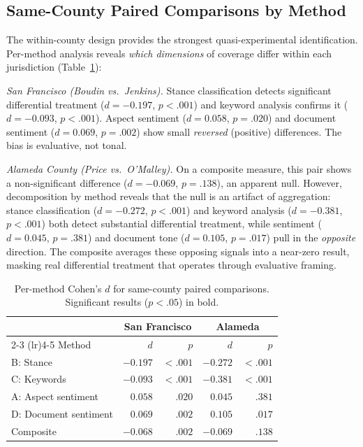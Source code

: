 \documentclass[12pt, letterpaper]{article}
\begin{document}
\subsection{Same-County Paired Comparisons by Method}
\label{sec:paired}

The within-county design provides the strongest quasi-experimental identification. Per-method analysis reveals \emph{which dimensions} of coverage differ within each jurisdiction (Table~\ref{tab:pairedmethod}):

\emph{San Francisco (Boudin vs.\ Jenkins).} Stance classification detects significant differential treatment ($d = -0.197$, $p < .001$) and keyword analysis confirms it ($d = -0.093$, $p < .001$). Aspect sentiment ($d = 0.058$, $p = .020$) and document sentiment ($d = 0.069$, $p = .002$) show small \emph{reversed} (positive) differences. The bias is evaluative, not tonal.

\emph{Alameda County (Price vs.\ O'Malley).} On a composite measure, this pair shows a non-significant difference ($d = -0.069$, $p = .138$), an apparent null. However, decomposition by method reveals that the null is an artifact of aggregation: stance classification ($d = -0.272$, $p < .001$) and keyword analysis ($d = -0.381$, $p < .001$) both detect substantial differential treatment, while sentiment ($d = 0.045$, $p = .381$) and document tone ($d = 0.105$, $p = .017$) pull in the \emph{opposite} direction. The composite averages these opposing signals into a near-zero result, masking real differential treatment that operates through evaluative framing.

\begin{table}[ht]
\centering
\caption{Per-method Cohen's $d$ for same-county paired comparisons. Significant results ($p < .05$) in bold.}
\label{tab:pairedmethod}
\begin{tabular}{lrrrr}
\toprule
& \multicolumn{2}{c}{San Francisco} & \multicolumn{2}{c}{Alameda} \\
\cmidrule(lr){2-3} \cmidrule(lr){4-5}
Method & $d$ & $p$ & $d$ & $p$ \\
\midrule
B: Stance           & $\mathbf{-0.197}$ & $< .001$ & $\mathbf{-0.272}$ & $< .001$ \\
C: Keywords          & $\mathbf{-0.093}$ & $< .001$ & $\mathbf{-0.381}$ & $< .001$ \\
A: Aspect sentiment  & $\mathbf{0.058}$  & $.020$   & $0.045$           & $.381$   \\
D: Document sentiment & $\mathbf{0.069}$ & $.002$   & $\mathbf{0.105}$  & $.017$   \\
\midrule
Composite            & $\mathbf{-0.068}$ & $.002$   & $-0.069$          & $.138$   \\
\bottomrule
\end{tabular}
\end{table}
\end{document}
